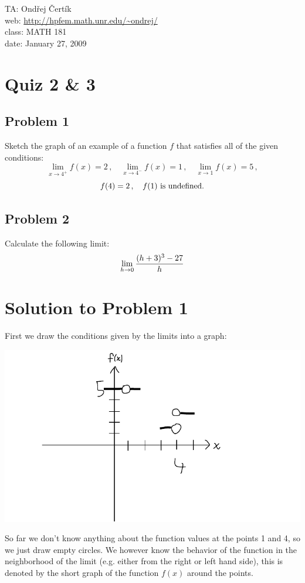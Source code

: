 \documentclass[10pt]{article}
\begin{document}
\noindent TA: Ondřej Čertík\\
web: \url{http://hpfem.math.unr.edu/~ondrej/}\\
class: MATH 181\\
date: January 27, 2009

\section*{Quiz 2 \& 3}

\subsection*{Problem 1}

Sketch the graph of an example of a function $f$ that satisfies all of the
given conditions:
$$\lim_{x\to4^+}f(x)=2\,,\quad
\lim_{x\to4^-}f(x)=1\,,\quad\lim_{x\to1}f(x)=5\,,$$
$$f(4)=2\,,\quad f(1)\ \hbox{is undefined}.$$

\subsection*{Problem 2}

Calculate the following limit:
$$\lim_{h\to0}{(h+3)^3-27\over h}$$

\section*{Solution to Problem 1}

First we draw the conditions given by the limits into a graph:

\includegraphics{diag1.pdf}

So far we don't know anything about the function values at the points 1 and 4,
so we just draw empty circles. We however know the behavior of the function in
the neighborhood of the limit (e.g. either from the right or left hand side),
this is denoted by the short graph of the function $f(x)$ around the points.
\end{document}

